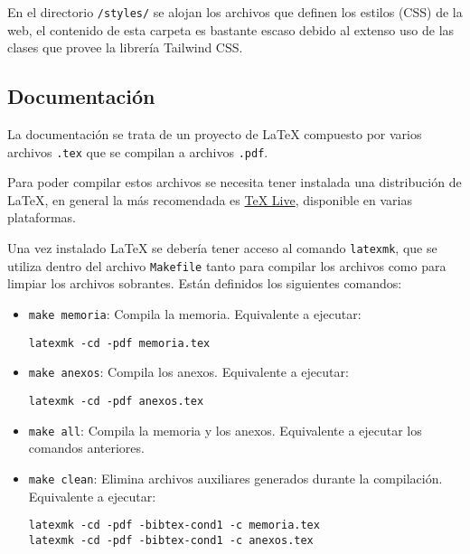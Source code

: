 En el directorio \texttt{/styles/} se alojan los archivos que definen los
estilos (CSS) de la web, el contenido de esta carpeta es bastante escaso debido
al extenso uso de las clases que provee la librería Tailwind CSS.

\subsection{Documentación}

La documentación se trata de un proyecto de \LaTeX{} compuesto por varios
archivos \texttt{.tex} que se compilan a archivos \texttt{.pdf}.

Para poder compilar estos archivos se necesita tener instalada una distribución
de \LaTeX{}, en general la más recomendada es
\href{https://www.tug.org/texlive/}{TeX Live}, disponible en varias plataformas.

Una vez instalado \LaTeX{} se debería tener acceso al comando \texttt{latexmk},
que se utiliza dentro del archivo \texttt{Makefile} tanto para compilar los
archivos como para limpiar los archivos sobrantes. Están definidos los
siguientes comandos:

\begin{itemize}
    \item \texttt{make memoria}: Compila la memoria. Equivalente a ejecutar:
          \begin{flushleft}
              \texttt{latexmk -cd -pdf memoria.tex}
          \end{flushleft}
    \item \texttt{make anexos}: Compila los anexos. Equivalente a ejecutar:
          \begin{flushleft}
              \texttt{latexmk -cd -pdf anexos.tex}
          \end{flushleft}
    \item \texttt{make all}: Compila la memoria y los anexos. Equivalente a
          ejecutar los comandos anteriores.
    \item \texttt{make clean}: Elimina archivos auxiliares generados durante la
          compilación. Equivalente a ejecutar:
          \begin{flushleft}
              \texttt{latexmk -cd -pdf -bibtex-cond1 -c memoria.tex} \\
              \texttt{latexmk -cd -pdf -bibtex-cond1 -c anexos.tex}
          \end{flushleft}
\end{itemize}


